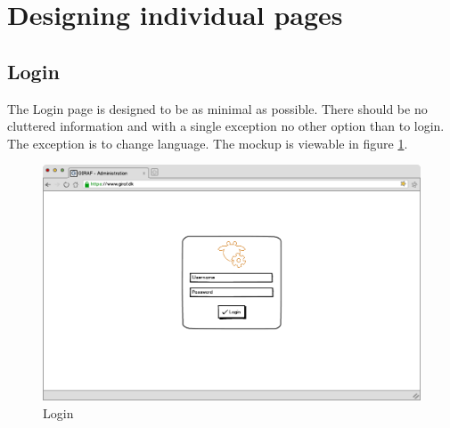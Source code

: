 \section{Designing individual pages}
\subsection{Login}
The Login page is designed to be as minimal as possible. There should be no cluttered information and with a single exception no other option than to login. The exception is to change language. The mockup is viewable in figure \ref{fig:loginDesign}.
\begin{figure}[p]
\centering
\includegraphics[width=1\textwidth]{images/mockup/login.png}
\caption{Login}
\label{fig:loginDesign}
\end{figure}

